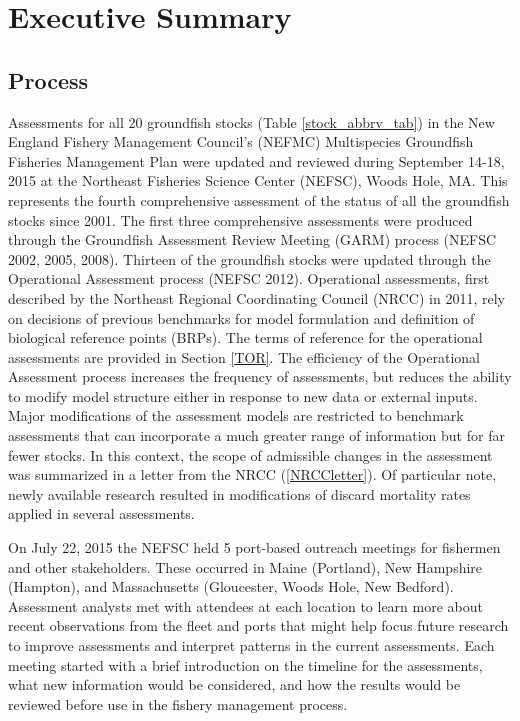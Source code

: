 
\section{Executive Summary}
\subsection{Process}
 
Assessments for all 20 groundfish stocks (Table \ref{stock_abbrv_tab}) in the New England Fishery Management Council’s (NEFMC) Multispecies Groundfish Fisheries Management Plan were updated and reviewed during September 14-18, 2015 at the Northeast Fisheries Science Center (NEFSC), Woods Hole, MA. This represents the fourth comprehensive assessment of the status of  all the  groundfish stocks since 2001. The first three comprehensive assessments were produced through the Groundfish Assessment Review Meeting (GARM) process (NEFSC 2002, 2005, 2008).  Thirteen of the groundfish stocks were updated through the Operational Assessment process (NEFSC 2012).  Operational assessments, first described by the Northeast Regional Coordinating Council (NRCC) in 2011, rely on decisions of previous benchmarks for model formulation and definition of biological reference points (BRPs).    The terms of reference for the operational assessments are provided in Section \ref{TOR}.  The efficiency of the Operational Assessment process increases the frequency of assessments, but reduces the ability to modify model structure either in response to new data or external inputs.  Major modifications of the assessment models are restricted to benchmark assessments that can incorporate a much greater range of information but for far fewer stocks.   In this context, the scope of admissible changes in the assessment was summarized in a letter from the NRCC (\ref{NRCCletter}).  Of particular note, newly available research resulted in modifications of discard mortality rates applied in several assessments.  

On July 22, 2015 the NEFSC held 5 port-based outreach meetings for fishermen and other stakeholders. These occurred in Maine (Portland), New Hampshire (Hampton), and Massachusetts (Gloucester, Woods Hole, New Bedford).  Assessment analysts met with attendees at each location to learn more about recent observations from the fleet and ports that might help focus future research to improve assessments and interpret patterns in the current assessments. Each meeting started with a brief introduction on the timeline for the assessments, what new information would be considered, and how the results would be reviewed before use in the fishery management process. 

